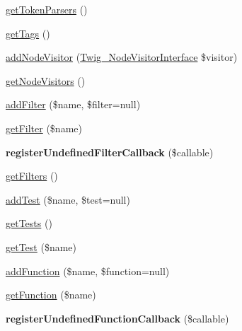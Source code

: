 \begin{DoxyCompactItemize}
\item 
\hyperlink{classTwig__Environment_a114cddcf0655fede1ff1759bfe16db49}{get\+Token\+Parsers} ()
\item 
\hyperlink{classTwig__Environment_acaa03ac08238e3c04a511bdac97aa9e0}{get\+Tags} ()
\item 
\hyperlink{classTwig__Environment_ad93b278aa4ffa66050241dc562ae0a63}{add\+Node\+Visitor} (\hyperlink{interfaceTwig__NodeVisitorInterface}{Twig\+\_\+\+Node\+Visitor\+Interface} \$visitor)
\item 
\hyperlink{classTwig__Environment_ad0160334d051d03b21b19ba166b5846a}{get\+Node\+Visitors} ()
\item 
\hyperlink{classTwig__Environment_aa1c2ecaa0dcf9c5b4257f22cf276af71}{add\+Filter} (\$name, \$filter=null)
\item 
\hyperlink{classTwig__Environment_ab77563abf66360418b74a012dfd1abfb}{get\+Filter} (\$name)
\item 
{\bfseries register\+Undefined\+Filter\+Callback} (\$callable)\hypertarget{classTwig__Environment_a08b5ccce6cf036cb1d9cf47033113371}{}\label{classTwig__Environment_a08b5ccce6cf036cb1d9cf47033113371}

\item 
\hyperlink{classTwig__Environment_ab6b58235885a09cdb54c677ad1c6a063}{get\+Filters} ()
\item 
\hyperlink{classTwig__Environment_a7275ae68295eb4ecf6ca39468adc22bc}{add\+Test} (\$name, \$test=null)
\item 
\hyperlink{classTwig__Environment_a91d46114aecb3727cca99856c2575d69}{get\+Tests} ()
\item 
\hyperlink{classTwig__Environment_af747c01e9132d7417a61c91f89f1a699}{get\+Test} (\$name)
\item 
\hyperlink{classTwig__Environment_afd5a65e7a3ee5af07986830d20ff6622}{add\+Function} (\$name, \$function=null)
\item 
\hyperlink{classTwig__Environment_a689090c89d7212fe07c6bcef9ae1111f}{get\+Function} (\$name)
\item 
{\bfseries register\+Undefined\+Function\+Callback} (\$callable)\hypertarget{classTwig__Environment_a207b6f20d7b5884d662ed7b82567e366}{}\label{classTwig__Environment_a207b6f20d7b5884d662ed7b82567e366}


\end{DoxyCompactItemize}
